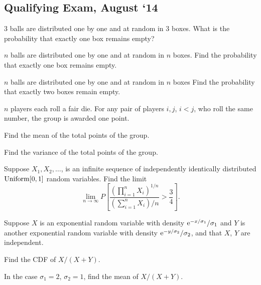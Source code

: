 \subsection{Qualifying Exam, August `14}
\begin{problem}
  \hfill
  \begin{alphlist}
  \item \(3\) balls are distributed one by one and at random in \(3\)
    boxes. What is the probability that exactly one box remains empty?
  \item \(n\) balls are distributed one by one and at random in \(n\)
    boxes. Find the probability that exactly one box remains empty.
  \item \(n\) balls are distributed one by one and at random in \(n\)
    boxes Find the probability that exactly two boxes remain empty.
  \end{alphlist}
\end{problem}
\begin{solution*}
\end{solution*}

\begin{problem}
  \(n\) players each roll a fair die. For any pair of players \(i,j\),
  \(i<j\), who roll the same number, the group is awarded one point.
  \begin{alphlist}
  \item Find the mean of the total points of the group.
  \item Find the variance of the total points of the group.
  \end{alphlist}
\end{problem}
\begin{solution*}
\end{solution*}

\begin{problem}
  Suppose \(X_1,X_2,\dotsc\), is an infinite sequence of independently
  identically distributed \(\operatorname{Uniform}[0,1]\) random variables. Find the
  limit
  \[
    \lim_{n\to\infty} P%
    \left[%
      \frac{\left(\prod_{i=1}^n X_i\right)^{1/n}}
      {\left(\sum_{i=1}^nX_i\right)/n}>\frac{3}{4}%
    \right].
  \]
\end{problem}
\begin{solution*}
\end{solution*}

\begin{problem}
  Suppose \(X\) is an exponential random variable with density
  \(\mathrm{e}^{-x/\sigma_1}/\sigma_1\) and \(Y\) is another exponential random
  variable with density \(\mathrm{e}^{-y/\sigma_2}/\sigma_2\), and that \(X\), \(Y\)
  are independent.
  \begin{alphlist}
  \item Find the CDF of \(X/(X+Y)\).
  \item In the case \(\sigma_1=2\), \(\sigma_2=1\), find the mean of
    \(X/(X+Y)\).
  \end{alphlist}
\end{problem}
\begin{solution*}
\end{solution*}

